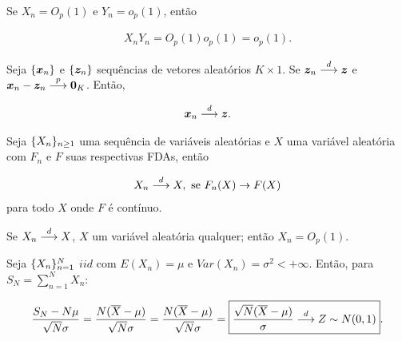 \documentclass[11pt,oneside,a4paper]{article}
\numberwithin{equation}{section}
\begin{document}
\begin{def1}
Se
$X_{n} = O_{p}(1)$ e $Y_{n} = o_{p}(1)$, então

\vspace{-1 em}
\begin{align*}
	X_{n} Y_{n} = O_{p}(1) o_{p}(1) = o_{p}(1).
\end{align*}
\end{def1}

\begin{def1}
Seja
$\{\boldsymbol{x}_{n}\}$ e $\{\boldsymbol{z}_{n}\}$
sequências de vetores aleatórios $K \times 1$.
Se $\boldsymbol{z}_{n}  \overset{d}{\longrightarrow}  \boldsymbol{z}$ e 
$\boldsymbol{x}_{n} - \boldsymbol{z}_{n}  \overset{p}{\longrightarrow}  \boldsymbol{0}_{K}$.
Então, 

\vspace{-1 em}
\begin{align*}
\boldsymbol{x}_{n}  \overset{d}{\longrightarrow}  \boldsymbol{z}.
\end{align*}

\end{def1}

\begin{def1}
Seja
$\{X_{n}\}_{n \geq 1}$  uma sequência de variáveis aleatórias e $X$ uma variável aleatória com $F_{n}$ e $F$ suas respectivas FDAs, então

\begin{align*}
	X_{n}  \overset{d}{\longrightarrow}  X, \text{ se } F_{n}(X) \to F(X)
\end{align*}
\noindent
para todo $X$ onde $F$ é contínuo.
\end{def1}

\begin{def1}
Se $X_{n}  \overset{d}{\longrightarrow}  X$, $X$ um variável aleatória qualquer; então $X_{n} = O_{p}(1)$.
\end{def1}

\begin{def1}
Seja $\{X_{n}\}_{n = 1}^{N}$ $iid$ com $E(X_{n}) = \mu$ e $Var(X_{n}) = \sigma^{2} < + \infty$.
Então, para $S_{N} = \sum_{n=1}^{N} X_{n}$:

\begin{align*}
\frac{S_{N} - N \mu }{ \sqrt{N} \sigma}
=
\frac{N ( \overline{X} - \mu ) }{ \sqrt{N} \sigma}
=
\frac{N ( \overline{X} - \mu ) }{ \sqrt{N} \sigma}
=
\boxed{
\frac{\sqrt{N} ( \overline{X} - \mu ) }{\sigma}
 \overset{d}{\longrightarrow}  Z \sim N(0,1)}.
\end{align*}
\end{def1}
\end{document}
